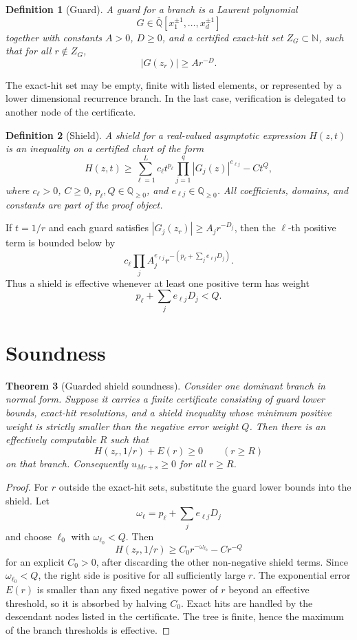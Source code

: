 \documentclass[11pt]{article}
\newtheorem{theorem}{Theorem}[section]
\newtheorem{definition}[theorem]{Definition}
\begin{document}
\begin{definition}[Guard]
A guard for a branch is a Laurent polynomial
\[
G\in \overline{\mathbb Q}[x_1^{\pm1},\ldots,x_d^{\pm1}]
\]
together with constants \(A>0\), \(D\ge0\), and a certified exact-hit set \(Z_G\subset \mathbb N\), such that for all \(r\notin Z_G\),
\[
|G(z_r)|\ge A r^{-D}.
\]
\end{definition}

The exact-hit set may be empty, finite with listed elements, or represented by a lower dimensional recurrence branch. In the last case, verification is delegated to another node of the certificate.

\begin{definition}[Shield]
A shield for a real-valued asymptotic expression \(H(z,t)\) is an inequality on a certified chart of the form
\[
H(z,t)
\ge
\sum_{\ell=1}^L c_\ell t^{p_\ell}
\prod_{j=1}^q |G_j(z)|^{e_{\ell j}}
-Ct^Q,
\]
where \(c_\ell>0\), \(C\ge0\), \(p_\ell,Q\in \mathbb Q_{\ge0}\), and \(e_{\ell j}\in \mathbb Q_{\ge0}\). All coefficients, domains, and constants are part of the proof object.
\end{definition}

If \(t=1/r\) and each guard satisfies \(|G_j(z_r)|\ge A_jr^{-D_j}\), then the \(\ell\)-th positive term is bounded below by
\[
c_\ell
\prod_j A_j^{e_{\ell j}}
r^{-\left(p_\ell+\sum_j e_{\ell j}D_j\right)}.
\]
Thus a shield is effective whenever at least one positive term has weight
\[
p_\ell+\sum_j e_{\ell j}D_j<Q.
\]

\section{Soundness}

\begin{theorem}[Guarded shield soundness]
Consider one dominant branch in normal form. Suppose it carries a finite certificate consisting of guard lower bounds, exact-hit resolutions, and a shield inequality whose minimum positive weight is strictly smaller than the negative error weight \(Q\). Then there is an effectively computable \(R\) such that
\[
H(z_r,1/r)+E(r)\ge0
\qquad(r\ge R)
\]
on that branch. Consequently \(u_{Mr+s}\ge0\) for all \(r\ge R\).
\end{theorem}

\begin{proof}
For \(r\) outside the exact-hit sets, substitute the guard lower bounds into the shield. Let
\[
\omega_\ell=p_\ell+\sum_j e_{\ell j}D_j
\]
and choose \(\ell_0\) with \(\omega_{\ell_0}<Q\). Then
\[
H(z_r,1/r)
\ge
C_0r^{-\omega_{\ell_0}}-C r^{-Q}
\]
for an explicit \(C_0>0\), after discarding the other non-negative shield terms. Since \(\omega_{\ell_0}<Q\), the right side is positive for all sufficiently large \(r\). The exponential error \(E(r)\) is smaller than any fixed negative power of \(r\) beyond an effective threshold, so it is absorbed by halving \(C_0\). Exact hits are handled by the descendant nodes listed in the certificate. The tree is finite, hence the maximum of the branch thresholds is effective.
\end{proof}
\end{document}
